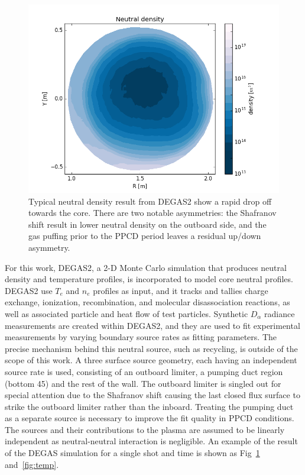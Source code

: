 \documentclass[aip, pop, preprint]{revtex4-1}
\begin{document}
\begin{figure}
	\centering
	\includegraphics[width = 1.\linewidth]{./plots/degas_neutral_n}
	\caption{Typical neutral density result from DEGAS2 show a rapid drop off towards the core. There are two notable asymmetries: the Shafranov shift result in lower neutral density on the outboard side, and the gas puffing prior to the PPCD period leaves a residual up/down asymmetry.}\label{fig:DEGAS2_2d_density}
\end{figure}%

For this work, DEGAS2, a 2-D Monte Carlo simulation that produces neutral density and
temperature profiles\cite{StotlerDEGAS2Manual}, is incorporated to model core neutral profiles. DEGAS2
use  $ T_{e} $ and $ n_{e} $ profiles as input, and it tracks and tallies
charge exchange, ionization, recombination, and molecular disassociation
reactions, as well as associated particle and heat flow of test particles.
Synthetic $ D_{\alpha} $ radiance measurements are created within DEGAS2, and they are
used to fit experimental measurements by varying boundary source rates
as fitting parameters. The precise mechanism behind this neutral source, such
as recycling, is outside of the scope of this work. A three surface source
geometry, each having an independent source rate is used, consisting of an
outboard limiter, a pumping duct region (bottom 45\textdegree) and the rest of
the wall. The outboard limiter is singled out for special attention due to the
Shafranov shift causing the last closed flux surface to strike the outboard
limiter rather than the inboard. Treating the pumping duct as a separate source is necessary to improve the fit quality in PPCD conditions. The sources
and their contributions to the plasma are assumed to be linearly independent as
neutral-neutral interaction is negligible. An example of the result of the
DEGAS simulation for a single shot and time is shown as Fig~\ref{fig:DEGAS2_2d_density} and~\ref{fig:temp}.
\end{document}
